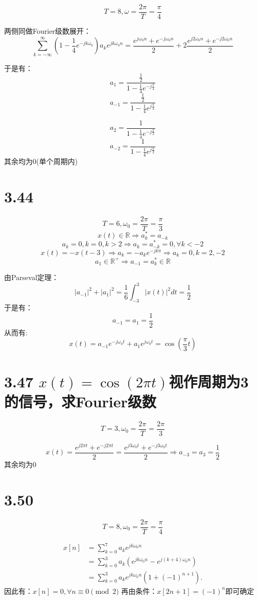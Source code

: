 \documentclass[UTF8,fontset=fandol,12pt,a4paper]{ctexart}
\begin{document}
$$T=8, \omega=\frac{2\pi}{T}=\frac{\pi}{4}$$

两侧同做Fourier级数展开：
\[
\sum_{k=-\infty}^{\infty}(1-\frac{1}{4}e^{-jk\omega_0})a_ke^{jk\omega_0n}=\frac{e^{j\omega_0n}+e^{-j\omega_0n}}{2}+2\frac{e^{j2\omega_0n}+e^{-j2\omega_0n}}{2}
\]

于是有：
\[
a_1=\frac{\frac{1}{2}}{1-\frac{1}{4}e^{-j\frac{\pi}{4}}}
\]
\[
a_{-1}=\frac{\frac{1}{2}}{1-\frac{1}{4}e^{j\frac{\pi}{4}}}
\]

\[
a_2=\frac{1}{1-\frac{1}{4}e^{-j\frac{\pi}{2}}}
\]
\[
a_{-2}=\frac{1}{1-\frac{1}{4}e^{j\frac{\pi}{2}}}
\]
\indent 其余均为0(单个周期内)

\section*{3.44}
$$T=6, \omega_0=\frac{2\pi}{T}=\frac{\pi}{3}$$
$$x(t) \in \mathbb{R} \Longrightarrow a_k^*=a_{-k}$$
$$a_k=0, k=0, k>2 \Longrightarrow a_k=a_{-k}^*=0, \forall k<-2$$ 
$$x(t)=-x(t-3)\Longrightarrow a_k=-a_ke^{-jk\pi}\Longrightarrow a_k=0, k=2,-2$$
$$a_1\in\mathbb{R}^+\Longrightarrow a_{-1}=a_k^*\in\mathbb{R}$$

由Parseval定理：
$$|a_{-1}|^2+|a_1|^2=\frac{1}{6}\int_{-3}^{3}|x(t)|^2dt=\frac{1}{2}$$
\indent 于是有：
$$a_{-1}=a_1=\frac{1}{2}$$
\indent 从而有:
$$x(t)=a_{-1}e^{-j\omega_0t}+a_1e^{j\omega_0t}=\cos{(\frac{\pi}{3}t)}$$

\section*{3.47 $x(t)=\cos{(2\pi t)}$视作周期为3的信号，求Fourier级数}

$$T=3,\omega_0=\frac{2\pi}{T}=\frac{2\pi}{3}$$

\[
x(t)=\frac{e^{j2\pi t}+e^{-j2\pi t}}{2}=\frac{e^{j3\omega_0 t}+e^{-j3\omega_0 t}}{2}
\Rightarrow a_{-3}=a_3=\frac{1}{2}
\]
\indent 其余均为0

\section*{3.50}

$$T=8,\omega_0=\frac{2\pi}{T}=\frac{\pi}{4}$$

\begin{align*}
  x[n]&=\sum_{k=0}^{7}a_ke^{jk\omega_0n}\\
      &=\sum_{k=0}^{3}a_k\left(e^{jk\omega_0n}-e^{j(k+4)\omega_0n}\right)\\
      &=\sum_{k=0}^{3}a_ke^{jk\omega_0n}\left(1+(-1)^{n+1}\right).
\end{align*}
因此有：$x[n]=0, \forall n\equiv0\pmod2$
再由条件：$x[2n+1]=(-1)^n$即可确定
\end{document}
